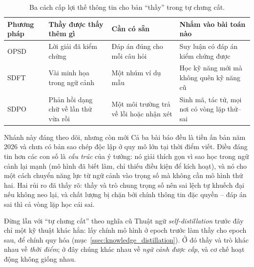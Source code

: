 \begin{table}[H]
\centering\small
\caption{Ba cách cấp lợi thế thông tin cho bản ``thầy'' trong tự chưng cất.}
\label{tab:self_distillation}
\begin{tabularx}{\textwidth}{@{}>{\raggedright\arraybackslash}p{1.9cm}>{\raggedright\arraybackslash}p{3.6cm}XX@{}}
\toprule
\textbf{Phương pháp} & \textbf{Thầy được thấy thêm gì} & \textbf{Cần có sẵn} & \textbf{Nhắm vào bài toán nào} \\
\midrule
OPSD & Lời giải đã kiểm chứng & Đáp án đúng cho mỗi câu hỏi & Suy luận có đáp án kiểm chứng được \\
\addlinespace
SDFT & Vài minh họa trong ngữ cảnh & Một nhúm ví dụ mẫu & Học kỹ năng mới mà không quên kỹ năng cũ \\
\addlinespace
SDPO & Phản hồi dạng chữ về lần thử vừa rồi & Một môi trường trả về lỗi hoặc nhận xét & Sinh mã, tác tử, mọi nơi có vòng lặp thử--sai \\
\bottomrule
\end{tabularx}
\end{table}

\begin{assess}{Nhánh này đáng theo dõi, nhưng còn mới}
Cả ba bài báo đều là tiền ấn bản năm 2026 và chưa có bản sao chép độc lập ở quy mô lớn tại thời điểm viết. Điều đáng tin hơn các con số là \emph{cấu trúc} của ý tưởng: nó giải thích gọn vì sao học trong ngữ cảnh lại mạnh (mô hình đã biết làm, chỉ thiếu điều kiện để kích hoạt), và nó cho một cách chuyển năng lực từ ngữ cảnh vào trọng số mà không cần mô hình thứ hai. Hai rủi ro đã thấy rõ: thầy và trò chung trọng số nên sai lệch tự khuếch đại nếu không neo lại, và chất lượng bị chặn bởi chính thông tin đặc quyền -- đáp án sai thì cả vòng lặp học cái sai.
\end{assess}

\begin{pitfall}{Đừng lẫn với ``tự chưng cất'' theo nghĩa cũ}
Thuật ngữ \emph{self-distillation} trước đây chỉ một kỹ thuật khác hẳn: lấy chính mô hình ở epoch trước làm thầy cho epoch sau, để chính quy hóa (mục~\ref{ssec:knowledge_distillation}). Ở đó thầy và trò khác nhau về \emph{thời điểm}; ở đây chúng khác nhau về \emph{ngữ cảnh được cấp}, và cơ chế hoạt động không giống nhau.
\end{pitfall}
